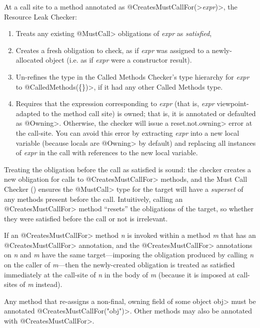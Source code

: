 At a call site to a method annotated as
\<@CreatesMustCallFor(>\emph{expr}\<)>, the Resource Leak Checker:
\begin{enumerate}
\item
  Treats any existing \<@MustCall> obligations of \emph{expr} as \emph{satisfied},
\item
  Creates a fresh obligation to check, as if \emph{expr} was assigned to a newly-allocated
  object (i.e. as if \emph{expr} were a constructor result).
\item
  Un-refines the type in the Called Methods Checker's type hierarchy for \emph{expr} to
  \<@CalledMethods(\{\})>, if it had any other Called Methods type.
\item
  Requires that the expression corresponding to \emph{expr} (that is, \emph{expr}
  viewpoint-adapted to the method call site) is owned; that is, it is
  annotated or defaulted as \<@Owning>.  Otherwise, the checker
  will issue a \<reset.not.owning> error at the call-site. You can avoid this
  error by extracting \emph{expr} into a new local variable (because
  locals are \<@Owning> by default) and replacing all instances of \emph{expr}
  in the call with references to the new local variable.
\end{enumerate}

Treating the obligation before the call as satisfied is sound: the
checker creates a new obligation for calls to \<@CreatesMustCallFor> methods,
and the Must Call Checker () ensures the
\<@MustCall> type for the target will have a \emph{superset} of any methods
present before the call. Intuitively, calling an \<@CreatesMustCallFor> method
``resets'' the obligations of the target, so whether they were satisfied before
the call or not is irrelevant.

If an \<@CreatesMustCallFor>
method \emph{n} is invoked within a method \emph{m} that has an \<@CreatesMustCallFor> annotation,
and the \<@CreatesMustCallFor> annotations on \emph{n} and \emph{m} have
the same target---imposing the obligation produced by calling \emph{n} on the caller of \emph{m}---then
the newly-created obligation is treated as satisfied immediately
at the call-site of \emph{n} in the body of \emph{m} (because it is imposed at call-sites of \emph{m}
instead).



Any method that re-assigns a non-final, owning field of some object \<obj>
must be annotated \<@CreatesMustCallFor("obj")>.
Other methods may also be annotated with \<@CreatesMustCallFor>.

